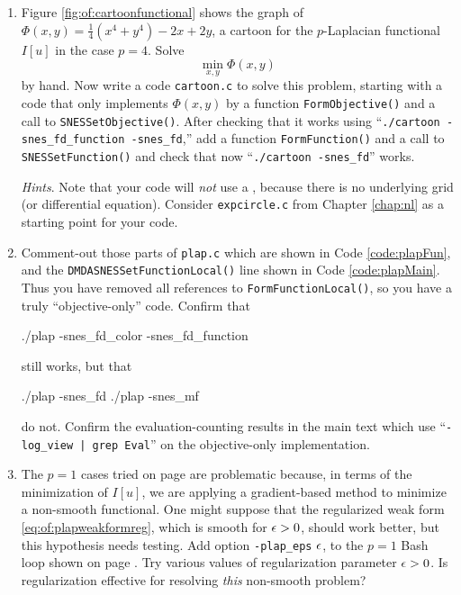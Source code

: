 \begin{enumerate}
\item Figure \ref{fig:of:cartoonfunctional} shows the graph of $\Phi(x,y)=\tfrac{1}{4}(x^4+y^4) - 2x + 2y$, a cartoon for the $p$-Laplacian functional $I[u]$ in the case $p=4$.  Solve
    $$\min_{x,y} \Phi(x,y)$$
by hand.  Now write a \PETSc code \texttt{cartoon.c} to solve this problem, starting with a code that only implements $\Phi(x,y)$ by a function \texttt{FormObjective()} and a call to \texttt{SNESSetObjective()}.  After checking that it works using ``\texttt{./cartoon -snes\_fd\_function -snes\_fd},'' add a function \texttt{FormFunction()} and a call to \texttt{SNESSetFunction()} and check that now ``\texttt{./cartoon -snes\_fd}'' works.

\emph{Hints}.  Note that your code will \emph{not} use a \pDMDA, because there is no underlying grid (or differential equation).  Consider \texttt{expcircle.c} from Chapter \ref{chap:nl} as a starting point for your code.

\item \label{exer:of:commentoutresidual}  Comment-out those parts of \texttt{plap.c} which are shown in Code \ref{code:plapFun}, and the \texttt{DMDASNESSetFunctionLocal()} line shown in Code \ref{code:plapMain}.  Thus you have removed all references to \texttt{FormFunctionLocal()}, so you have a truly ``objective-only'' code.  Confirm that
\begin{cline}
./plap -snes_fd_color -snes_fd_function
\end{cline}
still works, but that
\begin{cline}
./plap -snes_fd
./plap -snes_mf
\end{cline}
do not.  Confirm the evaluation-counting results in the main text which use ``\texttt{-log\_view | grep Eval}'' on the objective-only implementation.

\item \label{exer:of:regularizepone}  The $p=1$ cases tried on page \pageref{page:of:casepone} are problematic because, in terms of the minimization of $I[u]$,  we are applying a gradient-based method to minimize a non-smooth \citep{NocedalWright2006} functional.  One might suppose that the regularized weak form \eqref{eq:of:plapweakformreg}, which is smooth for $\epsilon>0$, should work better, but this hypothesis needs testing.  Add option \texttt{-plap\_eps} $\epsilon$, to the $p=1$ Bash loop shown on page \pageref{page:of:casepone}.  Try various values of regularization parameter $\epsilon>0$.  Is regularization effective for resolving \emph{this} non-smooth problem?


\end{enumerate}
